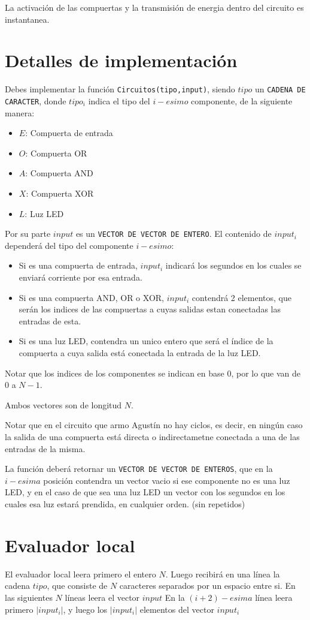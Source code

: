 \documentclass[fontsize=13pt, paper=a4, DIV=calc]{scrartcl}
\begin{document}
\begin{multicols*}{2}
La activación de las compuertas y la transmisión de energia dentro del circuito es instantanea.

\section{Detalles de implementación}
Debes implementar la función \texttt{Circuitos(tipo,input)}, siendo $tipo$ un \texttt{CADENA DE CARACTER}, donde $tipo_i$ indica el tipo del $i-esimo$ componente, de la siguiente manera:
\begin{itemize}
    \item $E$: Compuerta de entrada
    \item $O$: Compuerta OR
    \item $A$: Compuerta AND
    \item $X$: Compuerta XOR
    \item $L$: Luz LED
\end{itemize}
Por su parte $input$ es un \texttt{VECTOR DE VECTOR DE ENTERO}. El contenido de $input_i$ dependerá del tipo del componente $i-esimo$:
\begin{itemize}
    \item Si es una compuerta de entrada, $input_i$ indicará los segundos en los cuales se enviará corriente por esa entrada.
    \item Si es una compuerta AND, OR o XOR, $input_i$ contendrá 2 elementos, que serán los indices de las compuertas a cuyas salidas estan conectadas las entradas de esta.
    \item Si es una luz LED, contendra un unico entero que será el índice de la compuerta a cuya salida está conectada la entrada de la luz LED.
\end{itemize}
Notar que los indices de los componentes se indican en base 0, por lo que van de $0$ a $N-1$.

Ambos vectores son de longitud $N$.

Notar que en el circuito que armo Agustín no hay ciclos, es decir, en ningún caso la salida de una compuerta está directa o indirectametne conectada a una de las entradas de la misma. 

La función deberá retornar un \texttt{VECTOR DE VECTOR DE ENTEROS}, que en la $i-esima$ posición contendra un vector vacio si ese componente no es una luz LED, y en el caso de que sea una luz LED un vector con los segundos en los cuales esa luz estará prendida, en cualquier orden. (sin repetidos)

\section{Evaluador local}
El evaluador local leera primero el entero $N$.
Luego recibirá en una línea la cadena $tipo$, que consiste de $N$ caracteres separados por un espacio entre si.
En las siguientes $N$ líneas leera el vector $input$
En la $(i+2)-esima$ línea leera primero $|input_i|$, y luego los $|input_i|$ elementos del vector $input_i$


\end{multicols*}
\end{document}
